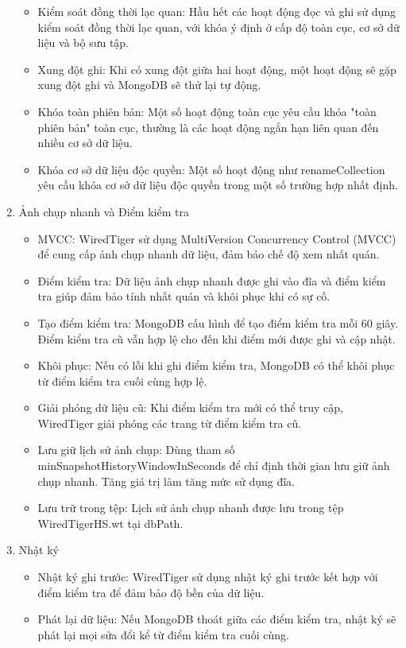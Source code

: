 \begin{enumerate}
\begin{itemize}
        \item Kiểm soát đồng thời lạc quan: Hầu hết các hoạt động đọc và ghi sử dụng kiểm soát đồng thời lạc quan, với khóa ý định ở cấp độ toàn cục, cơ sở dữ liệu và bộ sưu tập.
        \item Xung đột ghi: Khi có xung đột giữa hai hoạt động, một hoạt động sẽ gặp xung đột ghi và MongoDB sẽ thử lại tự động.
        \item Khóa toàn phiên bản: Một số hoạt động toàn cục yêu cầu khóa "toàn phiên bản" toàn cục, thường là các hoạt động ngắn hạn liên quan đến nhiều cơ sở dữ liệu.
        \item Khóa cơ sở dữ liệu độc quyền: Một số hoạt động như renameCollection yêu cầu khóa cơ sở dữ liệu độc quyền trong một số trường hợp nhất định.
    \end{itemize}
    \item Ảnh chụp nhanh và Điểm kiểm tra
    \begin{itemize}
        \item MVCC: WiredTiger sử dụng MultiVersion Concurrency Control (MVCC) để cung cấp ảnh chụp nhanh dữ liệu, đảm bảo chế độ xem nhất quán.
        \item Điểm kiểm tra: Dữ liệu ảnh chụp nhanh được ghi vào đĩa và điểm kiểm tra giúp đảm bảo tính nhất quán và khôi phục khi có sự cố.
        \item Tạo điểm kiểm tra: MongoDB cấu hình để tạo điểm kiểm tra mỗi 60 giây. Điểm kiểm tra cũ vẫn hợp lệ cho đến khi điểm mới được ghi và cập nhật.
        \item Khôi phục: Nếu có lỗi khi ghi điểm kiểm tra, MongoDB có thể khôi phục từ điểm kiểm tra cuối cùng hợp lệ.
        \item Giải phóng dữ liệu cũ: Khi điểm kiểm tra mới có thể truy cập, WiredTiger giải phóng các trang từ điểm kiểm tra cũ.
        \item Lưu giữ lịch sử ảnh chụp: Dùng tham số minSnapshotHistoryWindowInSeconds để chỉ định thời gian lưu giữ ảnh chụp nhanh. Tăng giá trị làm tăng mức sử dụng đĩa.
        \item Lưu trữ trong tệp: Lịch sử ảnh chụp nhanh được lưu trong tệp WiredTigerHS.wt tại dbPath.
    \end{itemize}
    \item Nhật ký
    \begin{itemize}
        \item Nhật ký ghi trước: WiredTiger sử dụng nhật ký ghi trước kết hợp với điểm kiểm tra để đảm bảo độ bền của dữ liệu.
        \item Phát lại dữ liệu: Nếu MongoDB thoát giữa các điểm kiểm tra, nhật ký sẽ phát lại mọi sửa đổi kể từ điểm kiểm tra cuối cùng.

\end{itemize}
\end{enumerate}
